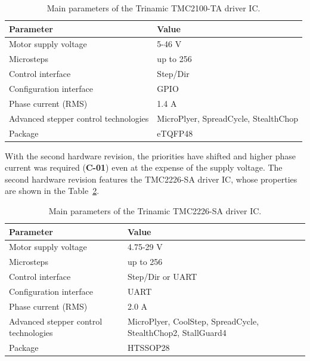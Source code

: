 \begin{table}[H]
    \centering
    \begin{tabular}{ |p{5cm}|p{7cm}| }
        \hline
        Parameter & Value \\
        \hline
        \hline
        Motor supply voltage & 5-46 V \\
        \hline
        Microsteps & up to 256 \\
        \hline
        Control interface & Step/Dir \\
        \hline
        Configuration interface & GPIO \\
        \hline
        Phase current (RMS) & 1.4 A \\
        \hline
        Advanced stepper control technologies & MicroPlyer, SpreadCycle, StealthChop \\
        \hline
        Package & eTQFP48 \\
        \hline
    \end{tabular}
    \caption{Main parameters of the Trinamic TMC2100-TA driver IC\cite{tmc_2100}.}
    \label{tab:tmc2100_param}
\end{table}


With the second hardware revision, the priorities have shifted and higher phase current was required (\textbf{C-01}) even at the expense of the supply voltage.
The second hardware revision features the TMC2226-SA driver IC, whose properties are shown in the Table~\ref{tab:tmc2226_param}.

\begin{table}[H]
    \centering
    \begin{tabular}{ |p{5cm}|p{7cm}| }
        \hline
        Parameter & Value \\
        \hline
        \hline
        Motor supply voltage & 4.75-29 V \\
        \hline
        Microsteps & up to 256 \\
        \hline
        Control interface & Step/Dir or UART \\
        \hline
        Configuration interface & UART \\
        \hline
        Phase current (RMS) & 2.0 A \\
        \hline
        Advanced stepper control technologies & MicroPlyer, CoolStep, SpreadCycle, StealthChop2, StallGuard4 \\
        \hline
        Package & HTSSOP28 \\
        \hline
    \end{tabular}
    \caption{Main parameters of the Trinamic TMC2226-SA driver IC\cite{tmc_2226}.}
    \label{tab:tmc2226_param}
\end{table}

